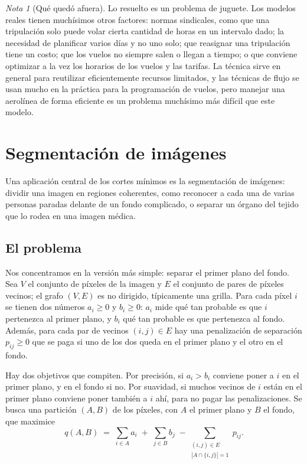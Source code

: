 \documentclass[12pt, spanish, oneside, openany]{book}
\theoremstyle{uprightplain}
\theoremstyle{definition}
\theoremstyle{remark}
\newtheorem{nota}[teorema]{Nota}
\theoremstyle{definition}
\begin{document}
\begin{nota}[Qué quedó afuera]
\label{nota:flujo-vuelos-postmortem}
Lo resuelto es un problema de juguete. Los modelos reales tienen muchísimos otros factores: normas sindicales, como que una tripulación solo puede volar cierta cantidad de horas en un intervalo dado; la necesidad de planificar varios días y no uno solo; que reasignar una tripulación tiene un costo; que los vuelos no siempre salen o llegan a tiempo; o que conviene optimizar a la vez los horarios de los vuelos y las tarifas. La técnica sirve en general para reutilizar eficientemente recursos limitados, y las técnicas de flujo se usan mucho en la práctica para la programación de vuelos, pero manejar una aerolínea de forma eficiente es un problema muchísimo más difícil que este modelo.
\end{nota}


\section{Segmentación de imágenes}
\label{sec:flujo-segmentacion}

Una aplicación central de los cortes mínimos es la segmentación de imágenes: dividir una imagen en regiones coherentes, como reconocer a cada una de varias personas paradas delante de un fondo complicado, o separar un órgano del tejido que lo rodea en una imagen médica.

\subsection{El problema}

Nos concentramos en la versión más simple: separar el primer plano del fondo. Sea $V$ el conjunto de píxeles de la imagen y $E$ el conjunto de pares de píxeles vecinos; el grafo $(V,E)$ es no dirigido, típicamente una grilla. Para cada píxel $i$ se tienen dos números $a_i\ge 0$ y $b_i\ge 0$: $a_i$ mide qué tan probable es que $i$ pertenezca al primer plano, y $b_i$ qué tan probable es que pertenezca al fondo. Además, para cada par de vecinos $(i,j)\in E$ hay una penalización de separación $p_{ij}\ge 0$ que se paga si uno de los dos queda en el primer plano y el otro en el fondo.

Hay dos objetivos que compiten. Por precisión, si $a_i>b_i$ conviene poner a $i$ en el primer plano, y en el fondo si no. Por suavidad, si muchos vecinos de $i$ están en el primer plano conviene poner también a $i$ ahí, para no pagar las penalizaciones. Se busca una partición $(A,B)$ de los píxeles, con $A$ el primer plano y $B$ el fondo, que maximice
\[
q(A,B)\;=\;\sum_{i\in A}a_i\;+\;\sum_{j\in B}b_j\;-\sum_{\substack{(i,j)\in E\\ |A\cap\{i,j\}|=1}}p_{ij}.
\]
\end{document}
